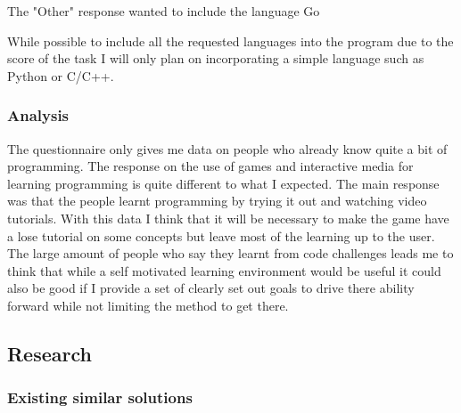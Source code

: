\documentclass[12pt]{article}
\begin{document}

The "Other" response wanted to include the language Go

While possible to include all the requested languages into the program due to the score of the task I will only plan on incorporating a simple language such as Python or C/C++.


\subsubsection{Analysis}
The questionnaire only gives me data on people who already know quite a bit of programming. The response on the use of games and interactive media for learning programming is quite different to what I expected. The main response was that the people learnt programming by trying it out and watching video tutorials. With this data I think that it will be necessary to make the game have a lose tutorial on some concepts but leave most of the learning up to the user. The large amount of people who say they learnt from code challenges leads me to think that while a self motivated learning environment would be useful it could also be good if I provide a set of clearly set out goals to drive there ability forward while not limiting the method to get there.


\newpage
\subsection{Research}
\subsubsection{Existing similar solutions}
\end{document}
